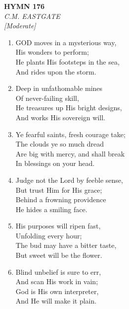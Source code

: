 \documentclass[11pt,a4paper]{article}
\begin{document}
\newpage
\begin{center}
    {\Large \textbf{HYMN 176}}
    \\
    \textit{C.M. EASTGATE}
    \\
    \textit{\small [Moderate]}
\end{center}
\vspace{1em}

\begin{enumerate}
    \item GOD moves in a mysterious way, \\
        His wonders to perform; \\
        He plants His footsteps in the sea, \\
        And rides upon the storm.

    \item Deep in unfathomable mines \\
        Of never-failing skill, \\
        He treasures up His bright designs, \\
        And works His sovereign will.

    \item Ye fearful saints, fresh courage take; \\
        The clouds ye so much dread \\
        Are big with mercy, and shall break \\
        In blessings on your head.

    \item Judge not the Lord by feeble sense, \\
        But trust Him for His grace; \\
        Behind a frowning providence \\
        He hides a smiling face.

    \item His purposes will ripen fast, \\
        Unfolding every hour; \\
        The bud may have a bitter taste, \\
        But sweet will be the flower.

    \item Blind unbelief is sure to err, \\
        And scan His work in vain; \\
        God is His own interpreter, \\
        And He will make it plain.

\end{enumerate}
\end{document}
